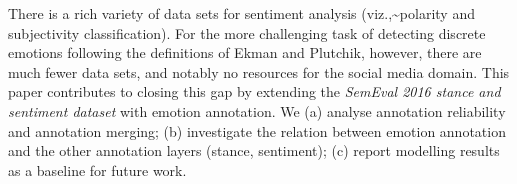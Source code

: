 There is a rich variety of data sets for sentiment analysis (viz.,{\textasciitilde}polarity and subjectivity classification). For the more challenging task of detecting discrete emotions following the definitions of Ekman and Plutchik, however, there are much fewer data sets, and notably no resources for the social media domain. This paper contributes to closing this gap by extending the \textit{SemEval 2016 stance and sentiment dataset} with emotion annotation. We (a) analyse annotation reliability and annotation merging; (b) investigate the relation between emotion annotation and the other annotation layers (stance, sentiment); (c) report modelling results as a baseline for future work.
